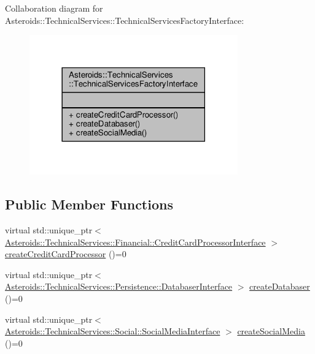 Collaboration diagram for Asteroids\+:\+:Technical\+Services\+:\+:Technical\+Services\+Factory\+Interface\+:\nopagebreak
\begin{figure}[H]
\begin{center}
\leavevmode
\includegraphics[width=254pt]{classAsteroids_1_1TechnicalServices_1_1TechnicalServicesFactoryInterface__coll__graph}
\end{center}
\end{figure}
\subsection*{Public Member Functions}
\begin{DoxyCompactItemize}
\item 
virtual std\+::unique\+\_\+ptr$<$ \hyperlink{classAsteroids_1_1TechnicalServices_1_1Financial_1_1CreditCardProcessorInterface}{Asteroids\+::\+Technical\+Services\+::\+Financial\+::\+Credit\+Card\+Processor\+Interface} $>$ \hyperlink{classAsteroids_1_1TechnicalServices_1_1TechnicalServicesFactoryInterface_afe781f2df87f128a9aaae9c0375277d3}{create\+Credit\+Card\+Processor} ()=0
\item 
virtual std\+::unique\+\_\+ptr$<$ \hyperlink{classAsteroids_1_1TechnicalServices_1_1Persistence_1_1DatabaserInterface}{Asteroids\+::\+Technical\+Services\+::\+Persistence\+::\+Databaser\+Interface} $>$ \hyperlink{classAsteroids_1_1TechnicalServices_1_1TechnicalServicesFactoryInterface_a0c292d2c4cd79ae168acbdd791a14b3c}{create\+Databaser} ()=0
\item 
virtual std\+::unique\+\_\+ptr$<$ \hyperlink{classAsteroids_1_1TechnicalServices_1_1Social_1_1SocialMediaInterface}{Asteroids\+::\+Technical\+Services\+::\+Social\+::\+Social\+Media\+Interface} $>$ \hyperlink{classAsteroids_1_1TechnicalServices_1_1TechnicalServicesFactoryInterface_a28196b5f4d7855fbc0d426a4004e857c}{create\+Social\+Media} ()=0
\end{DoxyCompactItemize}


